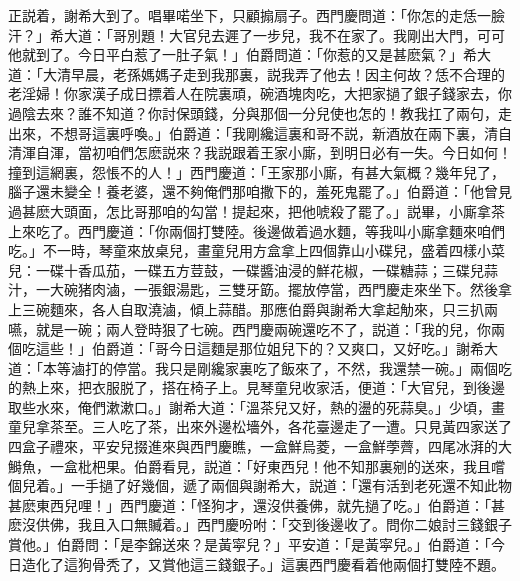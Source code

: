 正説着，謝希大到了。唱畢喏坐下，只顧搧扇子。西門慶問道：「你怎的走恁一臉汗？」希大道：「哥別題！大官兒去遲了一步兒，我不在家了。我剛出大門，可可他就到了。今日平白惹了一肚子氣！」伯爵問道：「你惹的又是甚麽氣？」希大道：「大清早晨，老孫媽媽子走到我那裏，説我弄了他去！因主何故？恁不合理的老淫婦！你家漢子成日摽着人在院裏頑，碗酒塊肉吃，大把家撾了銀子錢家去，你過陰去來？誰不知道？你討保頭錢，分與那個一分兒使也怎的！教我扛了兩句，走出來，不想哥這裏呼喚。」伯爵道：「我剛纔這裏和哥不説，新酒放在兩下裏，清自清渾自渾，當初咱們怎麽説來？我説跟着王家小廝，到明日必有一失。今日如何！撞到這網裏，怨悵不的人！」西門慶道：「王家那小廝，有甚大氣概？幾年兒了，腦子還未變全！養老婆，還不夠俺們那咱撒下的，羞死鬼罷了。」伯爵道：「他曾見過甚麽大頭面，怎比哥那咱的勾當！提起來，把他唬殺了罷了。」説畢，小廝拿茶上來吃了。西門慶道：「你兩個打雙陸。後邊做着過水麵，等我叫小廝拿麵來咱們吃。」不一時，琴童來放桌兒，畫童兒用方盒拿上四個靠山小碟兒，盛着四樣小菜兒：一碟十香瓜茄，一碟五方荳鼓，一碟醬油浸的鮮花椒，一碟糖蒜；三碟兒蒜汁，一大碗猪肉滷，一張銀湯匙，三雙牙筯。擺放停當，西門慶走來坐下。然後拿上三碗麵來，各人自取澆滷，傾上蒜醋。那應伯爵與謝希大拿起觔來，只三扒兩嚥，就是一碗；兩人登時狠了七碗。西門慶兩碗還吃不了，説道：「我的兒，你兩個吃這些！」伯爵道：「哥今日這麵是那位姐兒下的？又爽口，又好吃。」謝希大道：「本等滷打的停當。我只是剛纔家裏吃了飯來了，不然，我還禁一碗。」兩個吃的熱上來，把衣服脱了，搭在椅子上。見琴童兒收家活，便道：「大官兒，到後邊取些水來，俺們漱漱口。」謝希大道：「溫茶兒又好，熱的盪的死蒜臭。」少頃，畫童兒拿茶至。三人吃了茶，出來外邊松墻外，各花臺邊走了一遭。只見黃四家送了四盒子禮來，平安兒掇進來與西門慶瞧，一盒鮮烏菱，一盒鮮荸薺，四尾冰湃的大鰣魚，一盒枇杷果。伯爵看見，説道：「好東西兒！他不知那裏剜的送來，我且嚐個兒着。」一手撾了好幾個，遞了兩個與謝希大，説道：「還有活到老死還不知此物甚麽東西兒哩！」西門慶道：「怪狗才，還沒供養佛，就先撾了吃。」伯爵道：「甚麽沒供佛，我且入口無贓着。」西門慶吩咐：「交到後邊收了。問你二娘討三錢銀子賞他。」伯爵問：「是李錦送來？是黃寜兒？」平安道：「是黃寜兒。」伯爵道：「今日造化了這狗骨秃了，又賞他這三錢銀子。」這裏西門慶看着他兩個打雙陸不題。


